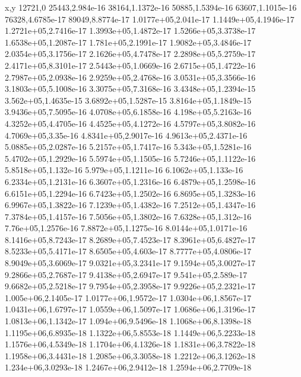 x,y
12721,0
25443,2.984e-16
38164,1.1372e-16
50885,1.5394e-16
63607,1.1015e-16
76328,4.6785e-17
89049,8.8774e-17
1.0177e+05,2.041e-17
1.1449e+05,4.1946e-17
1.2721e+05,2.7416e-17
1.3993e+05,1.4872e-17
1.5266e+05,3.3738e-17
1.6538e+05,1.2087e-17
1.781e+05,2.1991e-17
1.9082e+05,3.4846e-17
2.0354e+05,3.1756e-17
2.1626e+05,4.7478e-17
2.2898e+05,5.2759e-17
2.4171e+05,8.3101e-17
2.5443e+05,1.0669e-16
2.6715e+05,1.4722e-16
2.7987e+05,2.0938e-16
2.9259e+05,2.4768e-16
3.0531e+05,3.3566e-16
3.1803e+05,5.1008e-16
3.3075e+05,7.3168e-16
3.4348e+05,1.2394e-15
3.562e+05,1.4635e-15
3.6892e+05,1.5287e-15
3.8164e+05,1.1849e-15
3.9436e+05,7.5095e-16
4.0708e+05,6.1858e-16
4.198e+05,5.2163e-16
4.3252e+05,4.4705e-16
4.4525e+05,4.1272e-16
4.5797e+05,3.8082e-16
4.7069e+05,3.35e-16
4.8341e+05,2.9017e-16
4.9613e+05,2.4371e-16
5.0885e+05,2.0287e-16
5.2157e+05,1.7417e-16
5.343e+05,1.5281e-16
5.4702e+05,1.2929e-16
5.5974e+05,1.1505e-16
5.7246e+05,1.1122e-16
5.8518e+05,1.132e-16
5.979e+05,1.1211e-16
6.1062e+05,1.133e-16
6.2334e+05,1.2131e-16
6.3607e+05,1.2316e-16
6.4879e+05,1.2598e-16
6.6151e+05,1.2294e-16
6.7423e+05,1.2502e-16
6.8695e+05,1.3283e-16
6.9967e+05,1.3822e-16
7.1239e+05,1.4382e-16
7.2512e+05,1.4347e-16
7.3784e+05,1.4157e-16
7.5056e+05,1.3802e-16
7.6328e+05,1.312e-16
7.76e+05,1.2576e-16
7.8872e+05,1.1275e-16
8.0144e+05,1.0171e-16
8.1416e+05,8.7243e-17
8.2689e+05,7.4523e-17
8.3961e+05,6.4827e-17
8.5233e+05,5.4171e-17
8.6505e+05,4.603e-17
8.7777e+05,4.0806e-17
8.9049e+05,3.6069e-17
9.0321e+05,3.2341e-17
9.1594e+05,3.0027e-17
9.2866e+05,2.7687e-17
9.4138e+05,2.6947e-17
9.541e+05,2.589e-17
9.6682e+05,2.5218e-17
9.7954e+05,2.3958e-17
9.9226e+05,2.2321e-17
1.005e+06,2.1405e-17
1.0177e+06,1.9572e-17
1.0304e+06,1.8567e-17
1.0431e+06,1.6797e-17
1.0559e+06,1.5097e-17
1.0686e+06,1.3196e-17
1.0813e+06,1.1342e-17
1.094e+06,9.5496e-18
1.1068e+06,8.1398e-18
1.1195e+06,6.8935e-18
1.1322e+06,5.8553e-18
1.1449e+06,5.2233e-18
1.1576e+06,4.5349e-18
1.1704e+06,4.1326e-18
1.1831e+06,3.7822e-18
1.1958e+06,3.4431e-18
1.2085e+06,3.3058e-18
1.2212e+06,3.1262e-18
1.234e+06,3.0293e-18
1.2467e+06,2.9412e-18
1.2594e+06,2.7709e-18
